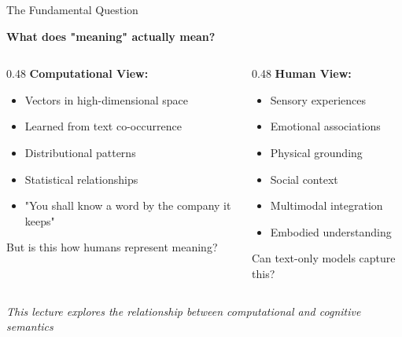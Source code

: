 \documentclass[aspectratio=169]{beamer}
\begin{document}
\begin{frame}[shrink=10]{The Fundamental Question 🤔}
\begin{center}
\LARGE
\textbf{What does "meaning" actually mean?}
\end{center}

\vspace{1em}

\begin{columns}[T]
\begin{column}{0.48\textwidth}
\textbf{Computational View:}
\begin{itemize}\setlength{\itemsep}{0pt}
    \item Vectors in high-dimensional space
    \item Learned from text co-occurrence
    \item Distributional patterns
    \item Statistical relationships
    \item "You shall know a word by the company it keeps"
\end{itemize}

\vspace{0.5em}
\alert{But is this how humans represent meaning?}
\end{column}

\begin{column}{0.48\textwidth}
\textbf{Human View:}
\begin{itemize}\setlength{\itemsep}{0pt}
    \item Sensory experiences
    \item Emotional associations
    \item Physical grounding
    \item Social context
    \item Multimodal integration
    \item Embodied understanding
\end{itemize}

\vspace{0.5em}
\alert{Can text-only models capture this?}
\end{column}
\end{columns}

\vspace{1em}

\begin{center}
\textit{This lecture explores the relationship between computational and cognitive semantics}
\end{center}
\end{frame}
\end{document}
